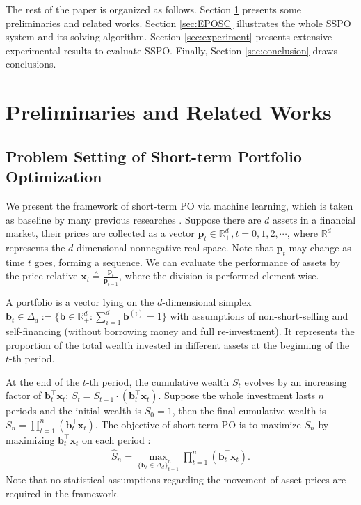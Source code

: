 \documentclass[twoside,11pt]{article}
\begin{document}
The rest of the paper is organized as follows. Section \ref{sec:preliminary} presents some preliminaries and related works. Section \ref{sec:EPOSC} illustrates the whole SSPO system and its solving algorithm. Section \ref{sec:experiment} presents extensive experimental results to evaluate SSPO. Finally, Section \ref{sec:conclusion} draws conclusions.











\section{Preliminaries and Related Works}
\label{sec:preliminary}


\subsection{Problem Setting of Short-term Portfolio Optimization}
\label{sec:problemsetting}
We present the framework of short-term PO via machine learning, which is taken as baseline by many previous researches \citep{uPS1,ONS,OLMAR,RMR2,olpsjmlr}. Suppose there are $d$ assets in a financial market, their prices are collected as a vector $\mathbf{p}_t\in \mathbb{R}_+^d, t=0,1,2,\cdots$, where $\mathbb{R}_+^d$ represents the $d$-dimensional nonnegative real space. Note that $\mathbf{p}_t$ may change as time $t$ goes, forming a sequence. We can evaluate the performance of assets by the price relative $\mathbf{x}_t\triangleq\frac{\mathbf{p}_t}{\mathbf{p}_{t-1}}$, where the division is performed element-wise. 

A portfolio is a vector lying on the $d$-dimensional simplex $\mathbf{b}_t \in \Delta_d:=\{\mathbf{b}\in \mathbb{R}_+^d: \sum_{i=1}^d \mathbf{b}^{(i)}=1 \}$ with assumptions of non-short-selling and self-financing (without borrowing money and full re-investment). It represents the proportion of the total wealth invested in different assets at the beginning of the $t$-th period.

At the end of the $t$-th period, the cumulative wealth $S_t$ evolves by an increasing factor of $\mathbf{b}_t^\top\mathbf{x}_t$: $S_t=S_{t-1}\cdot (\mathbf{b}_t^\top\mathbf{x}_t)$. Suppose the whole investment lasts $n$ periods and the initial wealth is $S_0=1$, then the final cumulative wealth is $S_n=\prod_{t=1}^n (\mathbf{b}_t^\top\mathbf{x}_t)$. The objective of short-term PO is to maximize $S_n$ by maximizing $\mathbf{b}_t^\top\mathbf{x}_t$ on each period \citep{uPS1,ONS,CORN,olazyupdate,OLMAR,RMR2,olpsjmlr}:
\begin{eqnarray}
\label{eqn:sequantchoose}
\hat{S}_n =\max_{\{\mathbf{b}_t\in \Delta_d\}_{t=1}^n}\prod_{t=1}^n (\mathbf{b}_t^\top\mathbf{x}_t).
\end{eqnarray}
Note that no statistical assumptions regarding the movement of asset prices are required in the framework.
\end{document}
